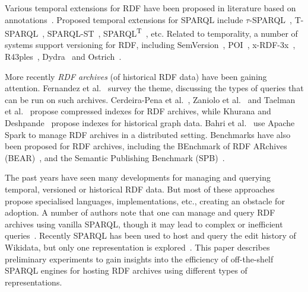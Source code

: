 \documentclass{llncs}
\begin{document}
Various temporal extensions for RDF have been proposed in literature based on annotations~\cite{GutierrezHV07,PuglieseUS08,ZimmermannLPS12}. Proposed temporal extensions for SPARQL include $\tau$-SPARQL~\cite{TappoletB09}, T-SPARQL~\cite{Grandi10}, SPARQL-ST~\cite{PerryJS11}, SPARQL\textsuperscript{T}~\cite{ZanioloGACG18}, etc. Related to temporality, a number of systems support versioning for RDF, including SemVersion~\cite{VolkelG06}, POI~\cite{TzitzikasTA08}, x-RDF-3x~\cite{NeumannW10}, R43ples~\cite{GraubeHU14}, Dydra~\cite{AndersonB16} and Ostrich~\cite{TaelmanSV18}.

More recently \textit{RDF archives} (of historical RDF data) have been gaining attention. Fernandez et al.~\cite{FernandezPU15} survey the theme, discussing the types of queries that can be run on such archives. Cerdeira{-}Pena et al.~\cite{Cerdeira-PenaFF16}, Zaniolo et al.~\cite{ZanioloGACG18} and Taelman et al.~\cite{TaelmanSHMV19} propose compressed indexes for RDF archives, while Khurana and Deshpande~\cite{KhuranaD16} propose indexes for historical graph data. Bahri et al.~\cite{BahriLA18} use Apache Spark to manage RDF archives in a distributed setting. Benchmarks have also been proposed for RDF archives, including the BEnchmark of RDF
ARchives (BEAR)~\cite{FernandezUPK19}, and the Semantic Publishing Benchmark (SPB)~\cite{Papakonstantinou18}.

The past years have seen many developments for managing and querying temporal, versioned or historical RDF data. But most of these approaches propose specialised languages, implementations, etc., creating an obstacle for adoption. A number of authors note that one can manage and query RDF archives using vanilla SPARQL, though it may lead to complex or inefficient queries~\cite{TappoletB09,FernandezUPK19}. Recently SPARQL has been used to host and query the edit history of Wikidata, but only one representation is explored~\cite{TanonS19}. This paper describes preliminary experiments to gain insights into the efficiency of off-the-shelf SPARQL engines for hosting RDF archives using different types of representations.


\end{document}
